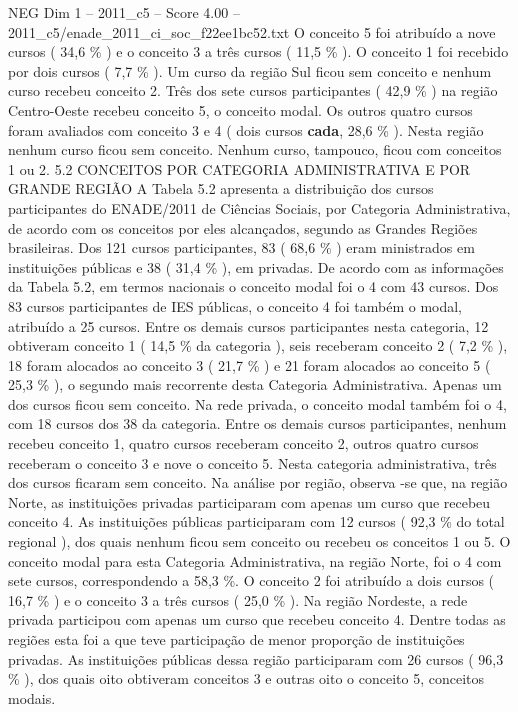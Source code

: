 \begin{textsample}{NEG Dim 1 – 2011\_c5 – Score 4.00 – 2011\_c5/enade\_2011\_ci\_soc\_f22ee1bc52.txt}
O conceito 5 foi atribuído a nove cursos ( 34,6 \% ) e o conceito 3 a três cursos ( 11,5 \% ).
O conceito 1 foi recebido por dois cursos ( 7,7 \% ).
Um curso da região Sul ficou sem conceito e nenhum curso recebeu conceito 2.
Três dos sete cursos participantes ( 42,9 \% ) na região Centro-Oeste recebeu conceito 5, o conceito modal.
Os outros quatro cursos foram avaliados com conceito 3 e 4 ( dois cursos \textbf{cada}, 28,6 \% ).
Nesta região nenhum curso ficou sem conceito.
Nenhum curso, tampouco, ficou com conceitos 1 ou 2. 5.2 CONCEITOS POR CATEGORIA ADMINISTRATIVA E POR GRANDE REGIÃO A Tabela 5.2 apresenta a distribuição dos cursos participantes do ENADE/2011 de Ciências Sociais, por Categoria Administrativa, de acordo com os conceitos por eles alcançados, segundo as Grandes Regiões brasileiras.
Dos 121 cursos participantes, 83 ( 68,6 \% ) eram ministrados em instituições públicas e 38 ( 31,4 \% ), em privadas.
De acordo com as informações da Tabela 5.2, em termos nacionais o conceito modal foi o 4 com 43 cursos.
Dos 83 cursos participantes de IES públicas, o conceito 4 foi também o modal, atribuído a 25 cursos.
Entre os demais cursos participantes nesta categoria, 12 obtiveram conceito 1 ( 14,5 \% da categoria ), seis receberam conceito 2 ( 7,2 \% ), 18 foram alocados ao conceito 3 ( 21,7 \% ) e 21 foram alocados ao conceito 5 ( 25,3 \% ), o segundo mais recorrente desta Categoria Administrativa.
Apenas um dos cursos ficou sem conceito.
Na rede privada, o conceito modal também foi o 4, com 18 cursos dos 38 da categoria.
Entre os demais cursos participantes, nenhum recebeu conceito 1, quatro cursos receberam conceito 2, outros quatro cursos receberam o conceito 3 e nove o conceito 5.
Nesta categoria administrativa, três dos cursos ficaram sem conceito.
Na análise por região, observa -se que, na região Norte, as instituições privadas participaram com apenas um curso que recebeu conceito 4.
As instituições públicas participaram com 12 cursos ( 92,3 \% do total regional ), dos quais nenhum ficou sem conceito ou recebeu os conceitos 1 ou 5.
O conceito modal para esta Categoria Administrativa, na região Norte, foi o 4 com sete cursos, correspondendo a 58,3 \%.
O conceito 2 foi atribuído a dois cursos ( 16,7 \% ) e o conceito 3 a três cursos ( 25,0 \% ).
Na região Nordeste, a rede privada participou com apenas um curso que recebeu conceito 4.
Dentre todas as regiões esta foi a que teve participação de menor proporção de instituições privadas.
As instituições públicas dessa região participaram com 26 cursos ( 96,3 \% ), dos quais oito obtiveram conceitos 3 e outras oito o conceito 5, conceitos modais.

\end{textsample}
